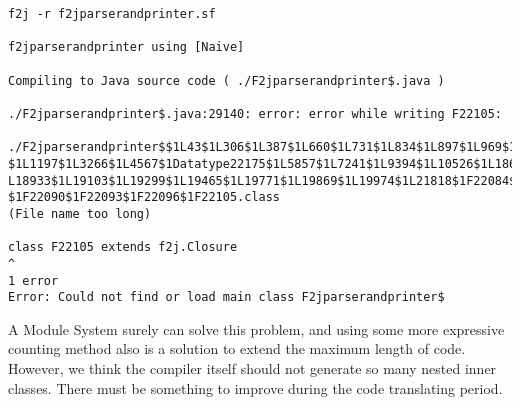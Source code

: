 \begin{itemize}
\begin{lstlisting}
f2j -r f2jparserandprinter.sf

f2jparserandprinter using [Naive]

Compiling to Java source code ( ./F2jparserandprinter$.java )

./F2jparserandprinter$.java:29140: error: error while writing F22105:

./F2jparserandprinter$$1L43$1L306$1L387$1L660$1L731$1L834$1L897$1L969$1L1050
$1L1197$1L3266$1L4567$1Datatype22175$1L5857$1L7241$1L9394$1L10526$1L18657$1
L18933$1L19103$1L19299$1L19465$1L19771$1L19869$1L19974$1L21818$1F22084$1F22087
$1F22090$1F22093$1F22096$1F22105.class
(File name too long)

class F22105 extends f2j.Closure
^
1 error
Error: Could not find or load main class F2jparserandprinter$
\end{lstlisting} 

A Module System surely can solve this problem, and using some more expressive counting method also is a solution to extend the maximum length of code. However, we think the compiler itself should not generate so many nested inner classes. There must be something to improve during the code translating period.

\end{itemize}